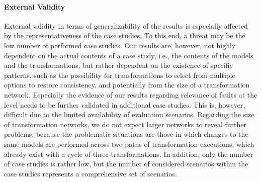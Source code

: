 
\paragraph{External Validity}
\label{chap:correctness_evaluation:categorization:discussion:limitations}

External validity in terms of generalizability of the results is especially affected by the representativeness of the case studies.
To this end, a threat may be the low number of performed case studies.
Our results are, however, not highly dependent on the actual contents of a case study, i.e., the contents of the models and the transformations, but rather dependent on the existence of specific patterns, such as the possibility for transformations to select from multiple options to restore consistency, and potentially from the size of a transformation network.
Especially the evidence of our results regarding relevance of faults at the \levelnetworkrule level needs to be further validated in additional case studies.
This is, however, difficult due to the limited availability of evaluation scenarios.
Regarding the size of transformation networks, we do not expect larger networks to reveal further problems, because the problematic situations are those in which changes to the same models are performed across two paths of transformation executions, which already exist with a cycle of three transformations.
In addition, only the number of case studies is rather low, but the number of considered scenarios within the case studies represents a comprehensive set of scenarios.


